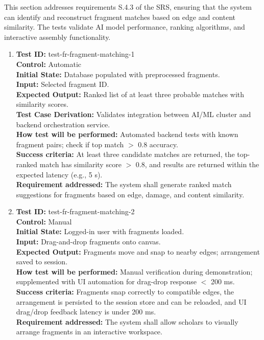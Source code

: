\documentclass[12pt, titlepage]{article}
\begin{document}
This section addresses requirements S.4.3 of the SRS, ensuring that the system can identify and reconstruct fragment matches based on edge and content similarity. The tests validate AI model performance, ranking algorithms, and interactive assembly functionality.

\begin{enumerate}
\item
\textbf{Test ID:} test-fr-fragment-matching-1\\
\textbf{Control:} Automatic\\
\textbf{Initial State:} Database populated with preprocessed fragments.\\
\textbf{Input:} Selected fragment ID.\\
\textbf{Expected Output:} Ranked list of at least three probable matches with similarity scores.\\
\textbf{Test Case Derivation:} Validates integration between AI/ML cluster and backend orchestration service.\\
\textbf{How test will be performed:} Automated backend tests with known fragment pairs; check if top match $>$ 0.8 accuracy.\\
\textbf{Success criteria:} At least three candidate matches are returned, the top-ranked match has similarity score $>$ 0.8, and results are returned within the expected latency (e.g., 5 s).\\
\textbf{Requirement addressed:} The system shall generate ranked match suggestions for fragments based on edge, damage, and content similarity.\\

\item
\textbf{Test ID:} test-fr-fragment-matching-2\\
\textbf{Control:} Manual\\
\textbf{Initial State:} Logged-in user with fragments loaded.\\
\textbf{Input:} Drag-and-drop fragments onto canvas.\\
\textbf{Expected Output:} Fragments move and snap to nearby edges; arrangement saved to session.\\
\textbf{How test will be performed:} Manual verification during demonstration; supplemented with UI automation for drag-drop response $<$ 200 ms.\\
\textbf{Success criteria:} Fragments snap correctly to compatible edges, the arrangement is persisted to the session store and can be reloaded, and UI drag/drop feedback latency is under 200 ms.\\
\textbf{Requirement addressed:} The system shall allow scholars to visually arrange fragments in an interactive workspace.\\
\end{enumerate}
\end{document}
